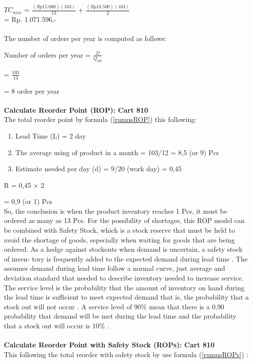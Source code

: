 \documentclass[12pt,a4paper,final]{iopart}
\begin{document}
$TC_{min}$ = $\frac{(Rp15.000)(103)}{13}$ + $\frac{(Rp18.500)(103)}{2}$\\

= Rp. 1.071.596,-\\ \\
The number of orders per year is computed as follows:

Number of orders per year = $\frac{D}{Q_{opt}}$

= $\frac{103}{13}$

= 8 order per year\\ \\
\textbf{Calculate Reorder Point (ROP): Cart 810}\\
The total reorder point by formula (\ref{rumusROP}) this following:
\begin{enumerate}[label=(\alph*)]
	\item Lead Time (L) = 2 day 
	\item The average using of product in a month = 103/12 = 8,5 (or 9) Pcs
	\item Estimate needed per day (d) = 9/20 (work day) = 0,45
\end{enumerate}

R = 0,45 $\times$ 2

= 0,9 (or 1) Pcs\\

So, the conclusion is when the product inventory reaches 1 Pcs, it must be ordered as many as 13 Pcs. For the possibility of shortages, this ROP model can be combined with Safety Stock, which is a stock reserve that must be held to avoid the shortage of goods, especially when waiting for goods that are being ordered. As a hedge against stockouts when demand is uncertain, a safety stock of inven- tory is frequently added to the expected demand during lead time \cite{Rusell2011}. The assumes demand during lead time follow a normal curve, just average and deviation standard that needed to describe inventory needed to increase service. The service level is the probability that the amount of inventory on hand during the lead time is sufficient to meet expected demand that is, the probability that a stock out will not occur \cite{Rusell2011}. A service level of 90\% mean that there is a 0.90 probability that demand will be met during the lead time and the probability that a stock out will occur is 10\% \cite{Rusell2011}.\\ \\
\textbf{Calculate Reorder Point with Safety Stock (ROPs): Cart 810}\\
This following the total reorder with safety stock by use formula (\ref{rumusROPs}) :
\end{document}
